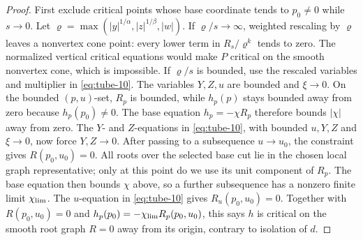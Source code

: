 \begin{proof}
First exclude critical points whose base coordinate tends to
\(p_0\ne0\) while \(s\to0\). Let
\(\varrho=\max(|y|^{1/\alpha},|z|^{1/\beta},|w|)\).
If \(\varrho/s\to\infty\), weighted rescaling by \(\varrho\) leaves a
nonvertex cone point: every lower term in \(R_s/\varrho^k\) tends to
zero. The normalized vertical critical equations would make
\(P\) critical on the smooth nonvertex cone, which is impossible.
If \(\varrho/s\) is bounded, use the rescaled variables and
multiplier in \eqref{eq:tube-10}. The variables \(Y,Z,u\) are
bounded and \(\xi\to0\). On the bounded \((p,u)\)-set,
\(R_p\) is bounded, while \(h_p(p)\) stays bounded away from zero
because \(h_p(p_0)\ne0\). The base equation \(h_p=-\chi R_p\)
therefore bounds \(\lvert\chi\rvert\) away from zero.
The \(Y\)- and \(Z\)-equations in \eqref{eq:tube-10}, with bounded
\(u,Y,Z\) and \(\xi\to0\), now force \(Y,Z\to0\).
After passing to a subsequence \(u\to u_0\), the constraint gives
\(R(p_0,u_0)=0\). All roots over the selected base cut lie in
the chosen local graph representative; only at this point do we
use its unit component of \(R_p\). The base equation then bounds
\(\chi\) above, so a further subsequence has a nonzero finite
limit \(\chi_{\rm lim}\). The \(u\)-equation in \eqref{eq:tube-10} gives
\(R_u(p_0,u_0)=0\). Together with \(R(p_0,u_0)=0\) and
\(h_p(p_0)=-\chi_{\rm lim}R_p(p_0,u_0)\), this says \(h\) is
critical on the smooth root graph \(R=0\) away from its origin,
contrary to isolation of \(d\).


\end{proof}
